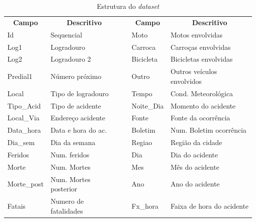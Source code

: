 \documentclass[11pt,article,oneside,a4paper]{abntex2}
\begin{document}
\begin{table}[h]
	\begin{small}
	\begin{center}
	\caption{Estrutura do \textit{dataset}} \label{tab:dataset1}
	\begin{tabular}{|p{2cm}|p{5cm}|p{}|p{2cm}|p{5cm}|} 
\cline{1-2} \cline{4-5} \multicolumn{1}{|c|}{\textbf{Campo}} & \multicolumn{1}{c|}{\textbf{Descritivo}} & & \multicolumn{1}{c|}{\textbf{Campo}} & \multicolumn{1}{c|}{\textbf{Descritivo}} \\ \cline{1-2} \cline{4-5}
Id          & Sequencial                     && Moto        & Motos envolvidas                    \\ \cline{1-2} \cline{4-5}
Log1        & Logradouro                     && Carroca     & Carroças envolvidas                 \\ \cline{1-2} \cline{4-5}
Log2        & Logradouro 2                   && Bicicleta   & Bicicletas envolvidas               \\ \cline{1-2} \cline{4-5}
Predial1    & Número próximo                 && Outro       & Outros veículos envolvidos          \\ \cline{1-2} \cline{4-5}
Local       & Tipo de logradouro             && Tempo       & Cond. Meteorológica                 \\ \cline{1-2} \cline{4-5}
Tipo\_Acid  & Tipo de acidente               && Noite\_Dia  & Momento do acidente                 \\ \cline{1-2} \cline{4-5}
Local\_Via  & Endereço acidente              && Fonte       & Fonte da ocorrência                 \\ \cline{1-2} \cline{4-5}
Data\_hora  & Data e hora do ac.             && Boletim     & Num. Boletim ocorrência             \\ \cline{1-2} \cline{4-5}
Dia\_sem    & Dia da semana                  && Regiao      & Região da cidade                    \\ \cline{1-2} \cline{4-5}
Feridos     & Num. feridos                   && Dia         & Dia do acidente                     \\ \cline{1-2} \cline{4-5}
Morte       & Num. Mortes                    && Mes         & Mês do acidente                     \\ \cline{1-2} \cline{4-5}
Morte\_post & Num. Mortes posterior          && Ano         & Ano do acidente                     \\ \cline{1-2} \cline{4-5}
Fatais      & Numero de fatalidades          && Fx\_hora    & Faixa de hora do acidente           \\ \cline{1-2} \cline{4-5}

\end{tabular}
\end{center}
\end{small}
\end{table}
\end{document}
